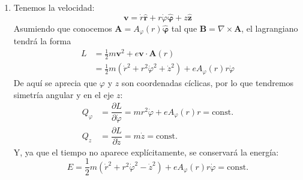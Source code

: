 \documentclass[]{article}
\numberwithin{equation}{section}
\newcommand{\0}{\textcolor{gray}{0}}
\newcommand{\ro}{\nabla\times}
\newcommand{\rv}{\mathbf{r}}
\newcommand{\zv}{\mathbf{z}}
\newcommand{\zhat}{\hat{\zv}}
\newcommand{\rhat}{\hat{\rv}}
\newcommand{\phat}{\hat{\mathbf{\varphi}}}
\newcommand{\pd}[2]{\dfrac{\partial #1}{\partial #2}}
\newcommand{\n}[1]{\mathbf{#1}}
\begin{document}
\begin{enumerate}
	\item[a)] Tenemos la velocidad:
	\begin{equation}
		\n{v} = \dot{r}\rhat + r \dot{\varphi} \phat + z \zhat
	\end{equation}
	Asumiendo que conocemos \(\n{A} = A_\varphi(r) \phat\) tal que \(\n{B} = \ro\n{A}\), el lagrangiano tendrá la forma
	\begin{align}
		L &= \frac{1}{2} m \n{v}^2 + e \n{v}\cdot\n{A}(r) \nonumber\\
		&= \frac{1}{2} m \left(\dot{r}^2 + r^2 \dot{\varphi}^2 + \dot{z}^2\right) + e A_\varphi(r) r \dot{\varphi}
	\end{align}
	De aquí se aprecia que \(\varphi\) y \(z\) son coordenadas cíclicas, por lo que tendremos simetría angular y en el eje \(z\):
	\begin{align}
		Q_\varphi &= \pd{L}{\dot{\varphi}} = m r^2 \dot{\varphi} + e A_\varphi(r) r = \mathrm{const.} \label{Qphi}\\
		Q_z &= \pd{L}{\dot{z}} = m\dot{z} = \mathrm{const.}
	\end{align}
	Y, ya que el tiempo no aparece explícitamente, se conservará la energía:
	\begin{equation}
		E = \frac{1}{2} m \left(\dot{r}^2 + r^2 \dot{\varphi}^2 - \dot{z}^2\right) + e A_\varphi(r) r \dot{\varphi} = \mathrm{const.} \label{E}
	\end{equation}
	

\end{enumerate}
\end{document}
